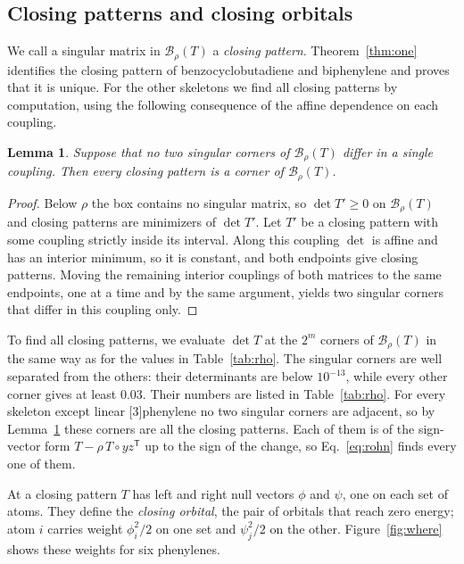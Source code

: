 \documentclass[11pt]{article}
\newtheorem{lemma}{Lemma}
\newcommand{\T}{\mathsf{T}}
\newcommand{\Bx}{\mathcal{B}}
\begin{document}
\subsection{Closing patterns and closing orbitals}
\label{sec:patterns}

We call a singular matrix in $\Bx_\rho(T)$ a \emph{closing pattern}. Theorem~\ref{thm:one} identifies the closing pattern of benzocyclobutadiene and biphenylene and proves that it is unique. For the other skeletons we find all closing patterns by computation, using the following consequence of the affine dependence on each coupling.

\begin{lemma}
\label{lem:corner}
Suppose that no two singular corners of $\Bx_\rho(T)$ differ in a single coupling. Then every closing pattern is a corner of $\Bx_\rho(T)$.
\end{lemma}

\begin{proof}
Below $\rho$ the box contains no singular matrix, so $\det T'\ge0$ on $\Bx_\rho(T)$ and closing patterns are minimizers of $\det T'$. Let $T'$ be a closing pattern with some coupling strictly inside its interval. Along this coupling $\det$ is affine and has an interior minimum, so it is constant, and both endpoints give closing patterns. Moving the remaining interior couplings of both matrices to the same endpoints, one at a time and by the same argument, yields two singular corners that differ in this coupling only.
\end{proof}

To find all closing patterns, we evaluate $\det T$ at the $2^m$ corners of $\Bx_\rho(T)$ in the same way as for the values in Table~\ref{tab:rho}. The singular corners are well separated from the others: their determinants are below $10^{-13}$, while every other corner gives at least 0.03. Their numbers are listed in Table~\ref{tab:rho}. For every skeleton except linear [3]phenylene no two singular corners are adjacent, so by Lemma~\ref{lem:corner} these corners are all the closing patterns. Each of them is of the sign-vector form $T-\rho\,T\circ yz^\T$ up to the sign of the change, so Eq.~\eqref{eq:rohn} finds every one of them.

At a closing pattern $T$ has left and right null vectors $\phi$ and $\psi$, one on each set of atoms. They define the \emph{closing orbital}, the pair of orbitals that reach zero energy; atom $i$ carries weight $\phi_i^2/2$ on one set and $\psi_j^2/2$ on the other. Figure~\ref{fig:where} shows these weights for six phenylenes.
\end{document}

